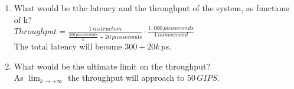 \documentclass{article}
\begin{document}
\begin{enumerate}[label=\textbf{\Alph*.}]
	\item What would be tthe latency and the throughput of the system,
	as functions of k? \\
	$Throughput = \frac{1\,instruction}{\frac{300\,picoseconds}{k} + 20\,picoseconds} \cdot
	\frac{1,000\,picoseconds}{1\,nanosecond}$ \\
	The total latency will become $300 + 20k\,ps$.
	\item What would be the ultimate limit on the throughput? \\
	As $\lim_{k \to +\infty}$ the throughput will approach to $50\,GIPS$.
\end{enumerate}
\end{document}

